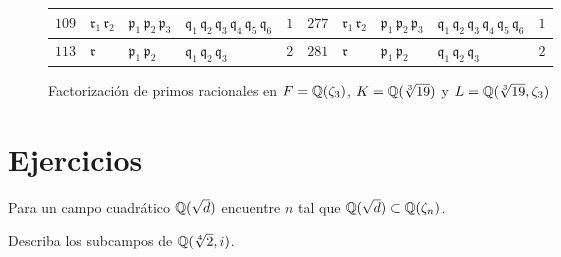\begin{figure}
\begin{center}
\begin{tabular}{x{0.75cm}x{1cm}x{1.25cm}x{2.5cm}x{0.75cm}x{0.75cm}x{1cm}x{1.25cm}x{2.5cm}x{0.75cm}}
      \hline
      $109$ & $\mathfrak{r}_1\,\mathfrak{r}_2$ & $\mathfrak{p}_1\,\mathfrak{p}_2\,\mathfrak{p}_3$ & $\mathfrak{q}_1\,\mathfrak{q}_2\,\mathfrak{q}_3\,\mathfrak{q}_4\,\mathfrak{q}_5\,\mathfrak{q}_6$ & $1$ & $277$ & $\mathfrak{r}_1\,\mathfrak{r}_2$ & $\mathfrak{p}_1\,\mathfrak{p}_2\,\mathfrak{p}_3$ & $\mathfrak{q}_1\,\mathfrak{q}_2\,\mathfrak{q}_3\,\mathfrak{q}_4\,\mathfrak{q}_5\,\mathfrak{q}_6$ & $1$ \tabularnewline
      \hline
      $113$ & $\mathfrak{r}$ & $\mathfrak{p}_1\,\mathfrak{p}_2$ & $\mathfrak{q}_1\,\mathfrak{q}_2\,\mathfrak{q}_3$ & $2$ & $281$ & $\mathfrak{r}$ & $\mathfrak{p}_1\,\mathfrak{p}_2$ & $\mathfrak{q}_1\,\mathfrak{q}_2\,\mathfrak{q}_3$ & $2$ \tabularnewline
      \hline
    \end{tabular}
  \end{center}

  \caption{Factorización de primos racionales en $F = \mathbb{Q} (\zeta_3)$, $K = \mathbb{Q} (\sqrt[3]{19})$ y $L = \mathbb{Q} (\sqrt[3]{19}, \zeta_3)$}
  \label{fig:cerradura-de-sqrt-19}
\end{figure}


\pagebreak


\section*{Ejercicios}

\begin{ejercicio}
  Para un campo cuadrático $\mathbb{Q} (\sqrt{d})$ encuentre $n$ tal que
  $\mathbb{Q} (\sqrt{d}) \subset \mathbb{Q} (\zeta_n)$.
\end{ejercicio}

\begin{ejercicio}
  Describa los subcampos de $\mathbb{Q} (\sqrt[4]{2},i)$.
\end{ejercicio}
